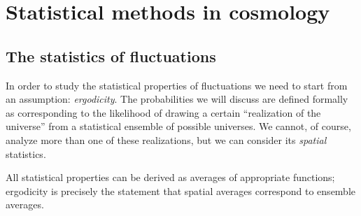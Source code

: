 \documentclass[main.tex]{subfiles}
\begin{document}
\section{Statistical methods in cosmology} \label{sec:statistical-methods}



\subsection{The statistics of fluctuations}

In order to study the statistical properties of fluctuations we need to start from an assumption: \emph{ergodicity}. 
The probabilities we will discuss are defined formally as corresponding to the likelihood of drawing a certain ``realization of the universe'' from a statistical ensemble of possible universes. 
We cannot, of course, analyze more than one of these realizations, but we can consider its \emph{spatial} statistics. 

All statistical properties can be derived as averages of appropriate functions; ergodicity is precisely the statement that spatial averages correspond to ensemble averages. 
\end{document}
